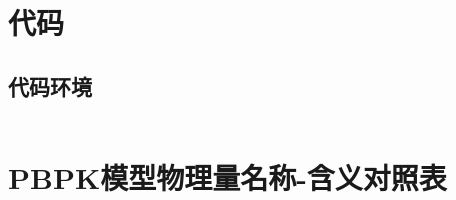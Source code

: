 \documentclass[a4paper,punct=banjiao,twoside]{ctexrep}
\theoremstyle{plain}
\theoremstyle{definition}
\theoremstyle{remark}
\begin{document}
\clearpage
\mbox{}
\thispagestyle{empty}

\appendix
\chapter{代码}
\section{代码环境}
\begin{lstlisting}[language=PYTHON]

\end{lstlisting}
\chapter{PBPK模型物理量名称-含义对照表}
\end{document}
